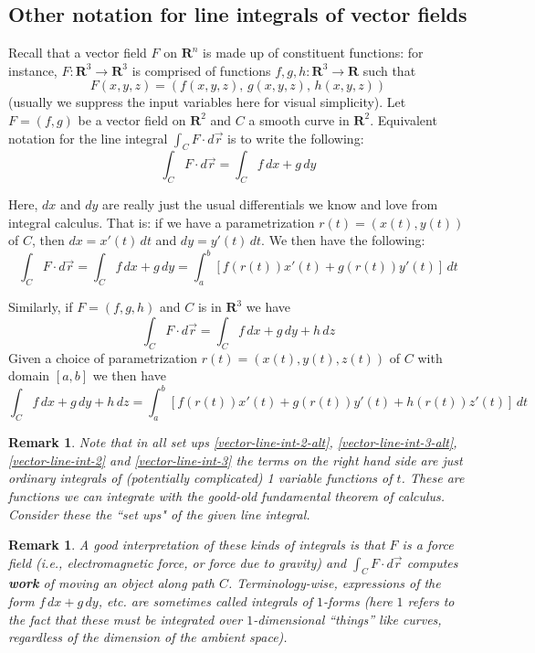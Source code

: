 \documentclass[12pt]{article}
\numberwithin{equation}{subsection}
\numberwithin{figure}{subsection}
\theoremstyle{note}
\newtheorem{remark}[subsection]{Remark}
\begin{document}
{\subsection{Other notation for line integrals of vector fields}
Recall that a vector field $F$ on $\mathbf{R}^n$ is made up of constituent functions: for instance, $F\colon \mathbf{R}^3\to \mathbf{R}^3$ is comprised of functions $f,g,h\colon \mathbf{R}^3\to\mathbf{R}$ such that \[ F(x,y,z)=\left(f(x,y,z), \, g(x,y,z), \,h(x,y,z)\right)\] (usually we suppress the input variables here for visual simplicity). Let $F=(f,g)$ be a vector field on $\mathbf{R}^2$ and $C$ a smooth curve in $\mathbf{R}^2$. Equivalent notation for the line integral $\displaystyle \int_C F\cdot d\vec{r}$ is to write the following: 
 \[\int_C F\cdot d\vec{r}= \int_C f \,dx+g\,dy \]


Here, $dx$ and $dy$ are really just the usual differentials we know and love from integral calculus. That is: if we have a parametrization $r(t)=(x(t),y(t))$ of $C$, then $dx=x'(t)\,dt$ and $dy=y'(t)\,dt$. We then have the following:
\begin{equation} \label{vector-line-int-2} \int_C F\cdot d\vec{r} =\int_C f\,dx + g\,dy= \int_a^b \left\lbrack f (r(t)) x'(t) + g(r(t)) y'(t) \right\rbrack\,dt\end{equation}


Similarly, if $F=(f,g,h)$ and $C$ is in $\mathbf{R}^3$ we have 
\[ \int_C F\cdot d\vec{r}= \int_C f \,dx+g\,dy+h\,dz\]
Given a choice of parametrization $r(t)=(x(t),y(t),z(t))$ of $C$ with domain $[a,b]$ we then have \begin{equation} \label{vector-line-int-3}
 \int_C f \,dx+g\,dy+h\,dz= \int_a^b \left\lbrack f(r(t)) x'(t)+ g(r(t)) y'(t)+h(r(t)) z'(t) \right\rbrack\,dt
\end{equation}

\begin{remark}Note that in all set ups \eqref{vector-line-int-2-alt}, \eqref{vector-line-int-3-alt}, \eqref{vector-line-int-2} and \eqref{vector-line-int-3} the terms on the right hand side are just ordinary integrals of (potentially complicated) 1 variable functions of $t$. These are functions we can integrate with the goold-old fundamental theorem of calculus. Consider these the ``set ups" of the given line integral. \end{remark}

\begin{remark}A good interpretation of these kinds of integrals is that $F$ is a force field (i.e., electromagnetic force, or force due to gravity) and $\int_C F\cdot d\vec{r}$ computes \textbf{work} of moving an object along path $C$. Terminology-wise, expressions of the form $f\,dx+g\,dy$, etc. are sometimes called integrals of \textit{$1$-forms} (here $1$ refers to the fact that these \textit{must} be integrated over $1$-dimensional ``things'' like curves, regardless of the dimension of the ambient space).\end{remark}

}
\end{document}
